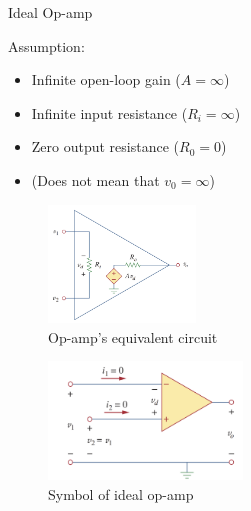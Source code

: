 \documentclass{beamer}
\begin{document}
\begin{frame}{Ideal Op-amp}

Assumption:
\begin{itemize}
    \item Infinite open-loop gain ($A = \infty$)
    \item Infinite input resistance ($R_i = \infty$)
    \item Zero output resistance ($R_0 = 0$)
    \item (Does not mean that $v_0 = \infty$)
\end{itemize}

\begin{multicols}{2}
    \sectiont{}
    \begin{figure}[H]
        \centering
        \includegraphics[width=0.35\textwidth]{img_opamp/3_opamp equivalent.png}
        \caption{Op-amp's equivalent circuit}
    \end{figure}
    \sectiont{}
    \begin{figure}[H]
        \centering
        \includegraphics[width=0.46\textwidth]{img_opamp/4_ideal op amp.png}
        \caption{Symbol of ideal op-amp}
    \end{figure}
    
\end{multicols}

    
\end{frame}
\end{document}
